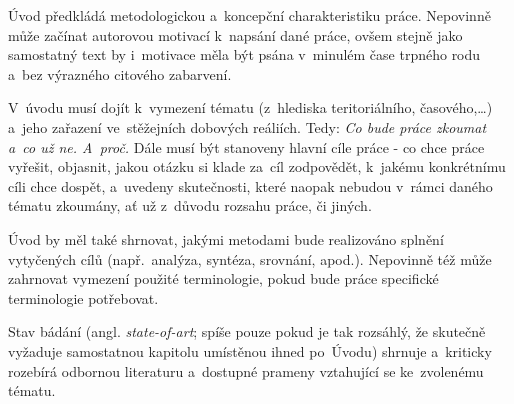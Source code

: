 Úvod předkládá metodologickou a~koncepční charakteristiku práce. Nepovinně může
začínat autorovou motivací k~napsání dané práce, ovšem stejně jako samostatný
text by i~motivace měla být psána v~minulém čase trpného rodu a~bez výrazného
citového zabarvení.

V~úvodu musí dojít k~vymezení tématu (z~hlediska teritoriálního,
časového,\dots) a~jeho zařazení ve~stěžejních dobových reáliích. Tedy: \textit{
Co bude práce zkoumat a~co už ne. A~proč.} Dále musí být stanoveny hlavní cíle
práce - co chce práce vyřešit, objasnit, jakou otázku si klade za~cíl
zodpovědět, k~jakému konkrétnímu cíli chce dospět, a~uvedeny skutečnosti, které
naopak nebudou v~rámci daného tématu zkoumány, ať už z~důvodu rozsahu práce, či
jiných.

Úvod by měl také shrnovat, jakými metodami bude realizováno splnění vytyčených
cílů (např.~analýza, syntéza, srovnání, apod.). Nepovinně též může zahrnovat
vymezení použité terminologie, pokud bude práce specifické terminologie
potřebovat.

Stav bádání (angl. \textit{state-of-art}; spíše pouze pokud je tak rozsáhlý, že
skutečně vyžaduje samostatnou kapitolu umístěnou ihned po~Úvodu) shrnuje
a~kriticky rozebírá odbornou literaturu a~dostupné prameny vztahující se
ke~zvolenému tématu.